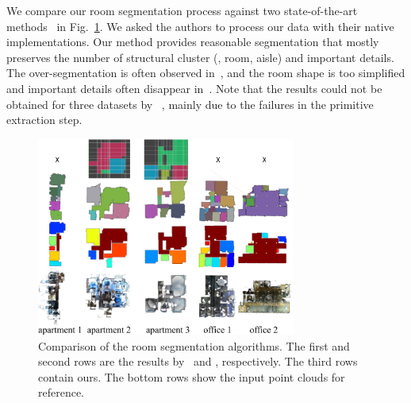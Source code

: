 We compare our room segmentation process against two state-of-the-art
methods~\cite{Mura2014,Turner2015} in Fig.~\ref{fig:result_all}.  We
asked the authors to process our data with their native
implementations. Our method provides reasonable segmentation that mostly
preserves the number of structural cluster (\eg, room, aisle) and
important details.
The over-segmentation is often observed in~\cite{Turner2015}, and the
room shape is too simplified and important details often disappear
in~\cite{Mura2014}. Note that the results could not be obtained for
three datasets by ~\cite{Mura2014}, mainly due to the failures in the
primitive extraction step.
\begin{figure}[!t]
\begin{center}
\includegraphics[width=85mm]{../figures/result_all.pdf}
\end{center}
 \vspace{-0.2cm}
\caption{Comparison of the room segmentation algorithms. The first and
second rows are the results by~\cite{Mura2014} and
\cite{Turner2015}, respectively. The third rows contain ours. The bottom
 rows show the input point clouds for reference.}  \label{fig:result_all}
 \vspace{-0.25cm}
\end{figure}





